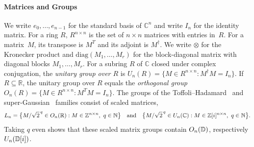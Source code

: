 \documentclass[acmsmall,screen,nonacm]{acmart}
\begin{document}
\paragraph{Matrices and Groups} We write $e_0,\dots,e_{n-1}$ for the standard basis of $\mathbb C^n$ and write $I_n$ for the identity matrix. For a ring $R$, $R^{n\times n}$ is the set of $n\times n$ matrices with entries in~$R$. 
For a matrix~$M$, its transpose is $M^{T}$ and its adjoint is $M^\dagger$. 
We write $\otimes$ for the Kronecker product and $\mathrm{diag}(M_1,\dots,M_r)$ for the block-diagonal matrix with diagonal blocks $M_1,\dots,M_r$. For a subring $R$ of $\mathbb C$ closed under complex conjugation, the \emph{unitary group over $R$} is $U_n(R)=\{M\in R^{n\times n} : M^\dagger M=I_n\}$. If $R\subseteq\mathbb R$, the unitary group over $R$ equals the \emph{orthogonal group} $O_n(R)=\{M\in R^{n\times n} : M^{T}M=I_n\}$. The groups of the Toffoli--Hadamard~\cite[Definition~5.1]{li2021on} and super-Gaussian~\cite[Equation~(12)]{amy2020numbertheoretic} families consist of scaled matrices,
\[
L_n=\bigl\{M/\sqrt2^{\,q}\in O_n(\mathbb R) : M\in\Z^{n\times n},\ q\in\mathbb N\bigr\}
\quad\text{and}\quad
\bigl\{M/\sqrt2^{\,q}\in U_n(\mathbb C) : M\in\Z[i]^{n\times n},\ q\in\mathbb N\bigr\}.
\]
Taking $q$ even shows that these scaled matrix groups contain $O_n(\mathbb{D})$, respectively $U_n(\mathbb{D}[i])$.
\end{document}
